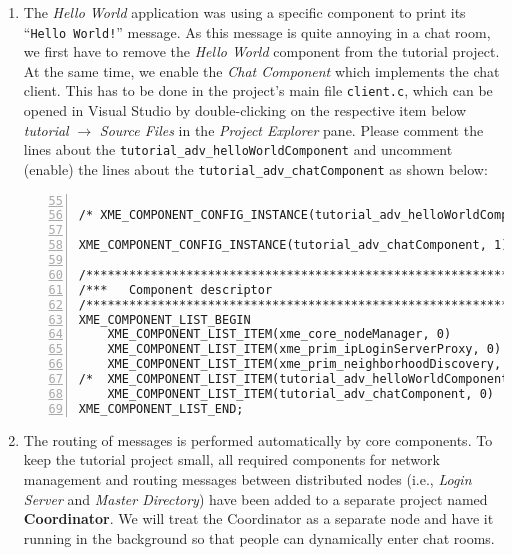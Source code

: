 \begin{enumerate}
	\item The \emph{Hello World} application was using a specific component to print its ``\texttt{Hello World!}'' message.
		As this message is quite annoying in a chat room, we first have to remove the \emph{Hello World} component from the tutorial project.
		At the same time, we enable the \emph{Chat Component} which implements the chat client.
		This has to be done in the project's main file {\tt client.c},
		which can be opened in Visual Studio by double-clicking on the respective item
		below \emph{tutorial} $\rightarrow$ \emph{Source Files} in the \emph{Project Explorer} pane.
		Please comment the lines about the {\tt tutorial\_adv\_helloWorldComponent}
		and uncomment (enable) the lines about the {\tt tutorial\_adv\_chatComponent} as shown below:

\begin{lstlisting}[numbers=left,firstnumber=55,breaklines]

/* XME_COMPONENT_CONFIG_INSTANCE(tutorial_adv_helloWorldComponent, 1); */                                               /~~/ Comment the line above

XME_COMPONENT_CONFIG_INSTANCE(tutorial_adv_chatComponent, 1);                                             /~~/ Uncomment the line above

/*************************************************************************/
/***   Component descriptor                                            ***/
/*************************************************************************/
XME_COMPONENT_LIST_BEGIN
	XME_COMPONENT_LIST_ITEM(xme_core_nodeManager, 0)
	XME_COMPONENT_LIST_ITEM(xme_prim_ipLoginServerProxy, 0)
	XME_COMPONENT_LIST_ITEM(xme_prim_neighborhoodDiscovery, 0)
/*	XME_COMPONENT_LIST_ITEM(tutorial_adv_helloWorldComponent, 0)*/                                               /~~/ Comment the line above
	XME_COMPONENT_LIST_ITEM(tutorial_adv_chatComponent, 0)                                         /~~/ Uncomment the line above
XME_COMPONENT_LIST_END;
\end{lstlisting}

	\item The routing of messages is performed automatically by \xme core components.
		To keep the tutorial project small, all required components for network management and routing messages
		between distributed nodes (i.e., \emph{Login Server} and \emph{Master Directory}) have been added to a separate project named {\bf Coordinator}.
		We will treat the Coordinator as a separate node and have it running in the background so that people can dynamically enter chat rooms.
		

\end{enumerate}
